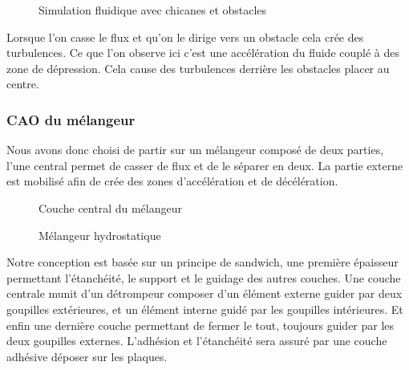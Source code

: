 \documentclass[a4paper, 11pt]{article}
\begin{document}
\begin{figure}[H]
    \centering
    \caption{Simulation fluidique avec chicanes et obstacles}
    \label{fig:simulation5}
\end{figure}
Lorsque l'on casse le flux et qu'on le dirige vers un obstacle cela crée des turbulences.
Ce que l'on observe ici c'est une accélération du fluide couplé à des zone de dépression.
Cela cause des turbulences derrière les obstacles placer au centre.


\subsubsection{CAO du mélangeur}
Nous avons donc choisi de partir sur un mélangeur composé de deux parties, l'une central 
permet de casser de flux et de le séparer en deux.
La partie externe est mobilisé afin de crée des zones d'accélération et de décélération.
\begin{multicols}{2}
    \begin{figure}[H]
        \centering
        \caption{Couche central du mélangeur}
        \label{fig:CAO_melangeur_couche2}
    \end{figure}
    \begin{figure}[H]
        \centering
        \caption{Mélangeur hydrostatique}
        \label{fig:CAO_melangeur}
    \end{figure}
\end{multicols}
Notre conception est basée sur un principe de sandwich, une première épaisseur permettant l'étanchéité, le support et le guidage des autres couches.
Une couche centrale munit d'un détrompeur composer d'un élément externe guider par deux goupilles extérieures, et un élément interne guidé par les goupilles intérieures.
Et enfin une dernière couche permettant de fermer le tout, toujours guider par les deux goupilles externes.
L'adhésion et l'étanchéité sera assuré par une couche adhésive déposer sur les plaques.
\end{document}
